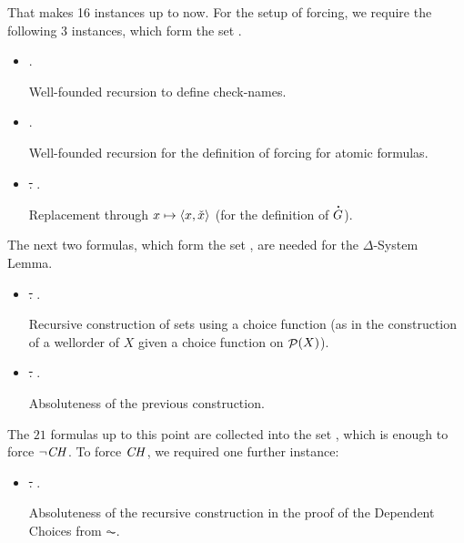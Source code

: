 That makes 16 instances up to now. For the setup of forcing, we
require the following 3 instances, which form the set
.

\begin{itemize}
\item {}.
  
  Well-founded recursion to define check-names.
\item {}.

  Well-founded recursion for the definition of forcing for atomic formulas.
\item
  \sout{.}
  .

  Replacement through $x\mapsto \langle x,\check{x}\rangle$ (for the
  definition of $\punto{G}$).
\end{itemize}
The next two formulas, which form the set
,
are needed for the $\Delta$-System Lemma.
\begin{itemize}
\item
  \sout{.}
  .

  Recursive construction of sets using a choice function (as in the
  construction of a wellorder of $X$ given a choice function on $\mathop{\mathcal{P}}(X)$).
\item
  \sout{.}
  .
  
  Absoluteness of the previous construction.
\end{itemize}
%
The $21$ formulas up to this point are collected into the set
, which is enough to
force $\neg\mathit{CH}$. To force $\mathit{CH}$, we required one further instance:
%
\begin{itemize}
\item
  \sout{.}
  .
  
  Absoluteness of the recursive construction in the proof of the
  Dependent Choices from $\AC$.
\end{itemize}


